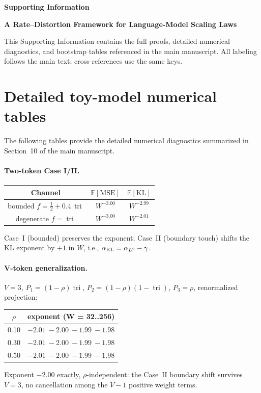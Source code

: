 \documentclass[12pt]{article}
\newcommand{\E}{\mathbb{E}}
\theoremstyle{remark}
\begin{document}
\begin{center}{\LARGE\bf Supporting Information}\end{center}
\begin{center}{\large\bf A Rate--Distortion Framework for Language-Model Scaling Laws}\end{center}
\doublespacing

This Supporting Information contains the full proofs, detailed numerical
diagnostics, and bootstrap tables referenced in the main manuscript.  All
labeling follows the main text; cross-references use the same keys.


\section{Detailed toy-model numerical tables}
\label{app:numerics_tables}

The following tables provide the detailed numerical diagnostics summarized in
Section~10 of the main manuscript.

\paragraph{Two-token Case I/II.}
\label{numerics:twotoken}
\begin{center}
\begin{tabular}{ccc}
\toprule
Channel & $\E[\text{MSE}]$ & $\E[\text{KL}]$ \\
\midrule
bounded $f=\frac12+0.4\,\operatorname{tri}$ & $W^{-3.00}$ & $W^{-2.99}$ \\
degenerate $f=\operatorname{tri}$ & $W^{-3.00}$ & $W^{-2.01}$ \\
\bottomrule
\end{tabular}
\end{center}
Case~I (bounded) preserves the exponent; Case~II (boundary touch) shifts the
KL exponent by $+1$ in $W$, i.e., $\alpha_{\rm KL}=\alpha_{L^2}-\gamma$.

\paragraph{V-token generalization.}
\label{numerics:vtoken}
$V=3$, $P_1=(1-\rho)\operatorname{tri}$, $P_2=(1-\rho)(1-\operatorname{tri})$,
$P_3=\rho$, renormalized projection:
\begin{center}
\begin{tabular}{cc}
\toprule
$\rho$ & exponent (W = 32..256) \\
\midrule
0.10 & $-2.01\ -2.00\ -1.99\ -1.98$ \\
0.30 & $-2.01\ -2.00\ -1.99\ -1.98$ \\
0.50 & $-2.01\ -2.00\ -1.99\ -1.98$ \\
\bottomrule
\end{tabular}
\end{center}
Exponent $-2.00$ exactly, $\rho$-independent: the Case~II boundary shift
survives $V=3$, no cancellation among the $V-1$ positive weight terms.
\end{document}
